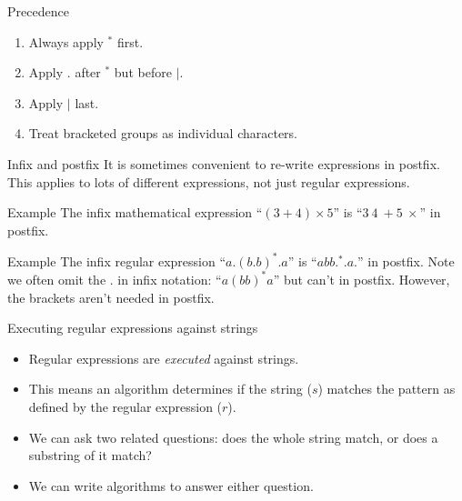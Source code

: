 \begin{frame}{Precedence}
  \begin{enumerate}
    \setlength\itemsep{5mm}
    \item Always apply $^*$ first.
    \item Apply $.$ after $^*$ but before $|$.
    \item Apply $|$ last.
    \item Treat bracketed groups as individual characters.
  \end{enumerate}
\end{frame}

\begin{frame}{Infix and postfix}
  It is sometimes convenient to re-write expressions in postfix.
  This applies to lots of different expressions, not just regular expressions.
  \vspace{2mm}
  \begin{exampleblock}{Example}
    The infix mathematical expression ``$(3+4) \times 5$'' is ``$3 \ 4 \ + 5 \ \times$'' in postfix.
  \end{exampleblock}
  \vspace{2mm}
  \begin{exampleblock}{Example}
    The infix regular expression ``$a.(b.b)^*.a$'' is ``$abb.^*.a.$'' in postfix.
    Note we often omit the $.$ in infix notation: ``$a(bb)^*a$'' but can't in postfix.
    However, the brackets aren't needed in postfix.
  \end{exampleblock}
\end{frame}

\begin{frame}{Executing regular expressions against strings}

  \begin{itemize}
    \item Regular expressions are \emph{executed} against strings.
    \item This means an algorithm determines if the string ($s$) matches the pattern as defined by the regular expression ($r$).
    \item We can ask two related questions: does the whole string match, or does a substring of it match?
    \item We can write algorithms to answer either question.
  \end{itemize}
\end{frame}